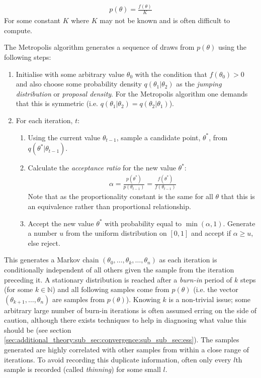 \documentclass[12pt]{article} %
\begin{document}
\begin{align}
p(\theta) = \frac{f(\theta)}{K} 
\end{align}
For some constant $K$ where $K$ may not be known and is often difficult to compute.

The Metropolis algorithm \citep{MetropolisMonteCarloMethod1949, MetropolisEquationStateCalculations1953} generates a sequence of draws from $p(\theta)$ using the following steps:

\begin{enumerate}
	\item Initialise with some arbitrary value $\theta_0$ with the condition that $f(\theta_0) > 0$ and also choose some probability density $q(\theta_1|\theta_2)$ as the \emph{jumping distribution} or \emph{proposal density}. For the Metropolis algorithm one demands that this is symmetric (i.e. $q(\theta_1 | \theta_2) = q(\theta_2 | \theta_1)$).
	\item For each iteration, $t$:
	\begin{enumerate}
		\item Using the current value $\theta_{t-1}$, sample a candidate point, $\theta^*$, from  $q(\theta^* | \theta_{t-1})$.
		\item Calculate the \emph{acceptance ratio} for the new value $\theta^*$:
		\begin{align}
		\alpha = \frac{p(\theta^*)}{p(\theta_{t-1})} = \frac{f(\theta^*)}{f(\theta_{t-1})}
		\end{align}
		Note that as the proportionality constant is the same for all $\theta$ that this is an equivalence rather than proportional relationship.
		\item Accept the new value $\theta^*$ with probability equal to $\min(\alpha, 1)$. Generate a number $u$ from the uniform distribution on $[0,1]$ and accept if $\alpha \geq u$, else reject.
	\end{enumerate}
\end{enumerate}
This generates a Markov chain $(\theta_0,\ldots,\theta_k,\ldots, \theta_n)$ as each iteration is conditionally independent of all others given the sample from the iteration preceding it. A stationary distribution is reached after a \emph{burn-in} period of $k$ steps (for some $k \in \mathbb{N}$) and all following samples come from $p(\theta)$ (i.e. the vector $(\theta_{k+1},\ldots,\theta_n)$ are samples from $p(\theta)$). Knowing $k$ is a non-trivial issue; some arbitrary large number of burn-in iterations is often assumed erring on the side of caution, although there exists techniques to help in diagnosing what value this should be (see section \ref{sec:additional_theory:sub_sec:convergence:sub_sub_sec:ess}). The samples generated are highly correlated with other samples from within a close range of iterations. To avoid recording this duplicate information, often only every $l$th sample is recorded (called \emph{thinning}) for some small $l$.
\end{document}
